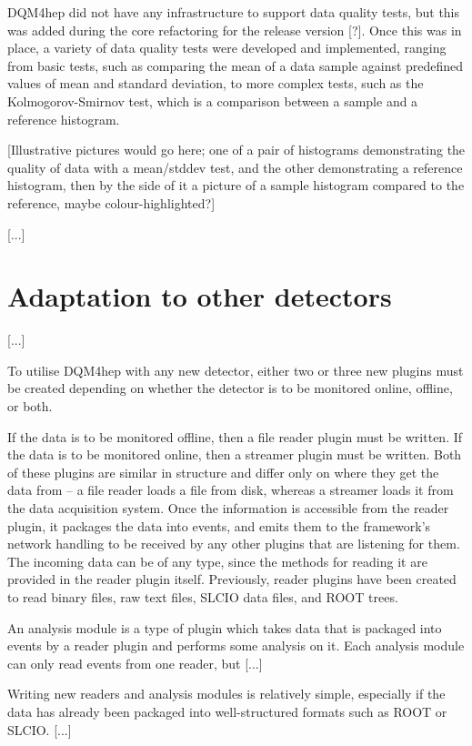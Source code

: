 DQM4hep did not have any infrastructure to support data quality tests, but this was added during the core refactoring for the release version [?]. Once this was in place, a variety of data quality tests were developed and implemented, ranging from basic tests, such as comparing the mean of a data sample against predefined values of mean and standard deviation, to more complex tests, such as the Kolmogorov-Smirnov test, which is a comparison between a sample and a reference histogram.

[Illustrative pictures would go here; one of a pair of histograms demonstrating the quality of data with a mean/stddev test, and the other demonstrating a reference histogram, then by the side of it a picture of a sample histogram compared to the reference, maybe colour-highlighted?]

[...]

\section{Adaptation to other detectors}

[...]

To utilise DQM4hep with any new detector, either two or three new plugins must be created depending on whether the detector is to be monitored online, offline, or both.

If the data is to be monitored offline, then a file reader plugin must be written. If the data is to be monitored online, then a streamer plugin must be written. Both of these plugins are similar in structure and differ only on where they get the data from -- a file reader loads a file from disk, whereas a streamer loads it from the data acquisition system. Once the information is accessible from the reader plugin, it packages the data into events, and emits them to the framework's network handling to be received by any other plugins that are listening for them. The incoming data can be of any type, since the methods for reading it are provided in the reader plugin itself. Previously, reader plugins have been created to read binary files, raw text files, SLCIO data files, and ROOT trees.

An analysis module is a type of plugin which takes data that is packaged into events by a reader plugin and performs some analysis on it. Each analysis module can only read events from one reader, but [...] 

Writing new readers and analysis modules is relatively simple, especially if the data has already been packaged into well-structured formats such as ROOT or SLCIO. [...]

